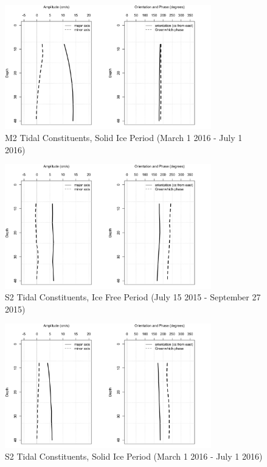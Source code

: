 \documentclass[12pt]{dforeport}
\begin{document}
\begin{figure}  
\centering
\includegraphics[width = 0.8\textwidth]{./figures/54_M2TC_si_2015.png}
\caption[M2 Tidal Constituents, Solid Ice, 2015]{M2 Tidal Constituents, Solid Ice Period (March 1 2016 - July 1 2016)}
\label{f:m2_si_2015}
\end{figure}


\begin{figure}  
\centering
\includegraphics[width = 0.8\textwidth]{./figures/55_S2TC_if_2015.png}
\caption[S2 Tidal Constituents, Ice free, 2015]{S2 Tidal Constituents, Ice Free Period (July 15 2015 - September 27 2015)}
\label{f:s2_if_2015}
\end{figure}

\begin{figure}  
\centering
\includegraphics[width = 0.8\textwidth]{./figures/56_S2TC_si_2015.png}
\caption[S2 Tidal Constituents, Solid Ice, 2015]{S2 Tidal Constituents, Solid Ice Period (March 1 2016 - July 1 2016)}
\label{f:s2_si_2015}
\end{figure}
\end{document}
